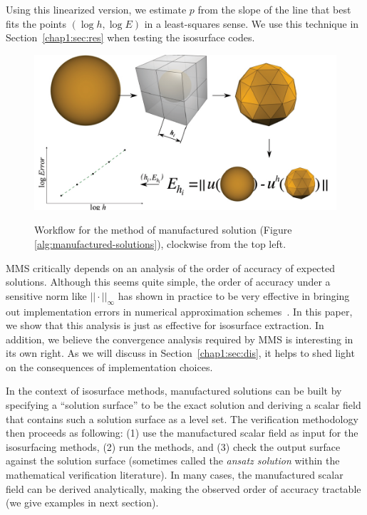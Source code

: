 Using this linearized version, we estimate $p$ from the slope of 
the line that best fits the points $(\log h,\log E)$ in a
least-squares sense. We use this technique in Section~\ref{chap1:sec:res}
when testing the isosurface codes.

\begin{figure}[h]
\centering
\includegraphics[width=0.95\linewidth,keepaspectratio=true]{chapter2/figures/mms.pdf}
\label{fig:mms-flow}
\caption{Workflow for the method of manufactured solution (Figure \ref{alg:manufactured-solutions}), clockwise from the top left.}
\end{figure}

MMS critically depends on an analysis of the order of accuracy of
expected solutions. Although this seems quite simple, the order of
accuracy under a sensitive norm like $||\cdot||_\infty$ has shown in
practice to be very effective in bringing out implementation errors in
numerical approximation schemes~\cite{Roy2005,babuska04}. In this
paper, we show that this analysis is just as effective for isosurface
extraction. In addition, we believe the convergence analysis required
by MMS is interesting in its own right. As we will discuss in
Section~\ref{chap1:sec:dis}, it helps to shed light on the consequences of
implementation choices.

In the context of isosurface methods, manufactured solutions can be built by
specifying a ``solution surface'' to be the exact solution and deriving a 
scalar field that contains such a solution surface as a level set. The 
verification methodology then proceeds as following: 
(1) use the manufactured scalar field as input for the isosurfacing 
methods, (2) run the methods, and (3) check the output surface against 
the solution surface (sometimes called the {\em ansatz solution} within
the mathematical verification literature).
In many cases, the manufactured scalar field can be derived analytically, 
making the observed order of accuracy tractable (we give
examples in next section).

